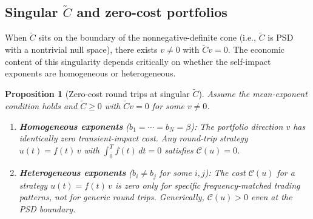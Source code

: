 \documentclass[12pt]{article}
\newtheorem{proposition}[theorem]{Proposition}
\theoremstyle{definition}
\theoremstyle{remark}
\newcommand{\bC}{\widetilde{C}}
\begin{document}
\subsection{Singular \texorpdfstring{$\bC$}{C-tilde} and zero-cost portfolios}
\label{sec:singular}

When $\bC$ sits on the boundary of the nonnegative-definite cone (i.e., $\bC$
is PSD with a nontrivial null space), there exists $v\neq 0$ with $\bC v = 0$.
The economic content of this singularity depends critically on whether the
self-impact exponents are homogeneous or heterogeneous.

\begin{proposition}[Zero-cost round trips at singular $\bC$]\label{prop:singular}
Assume the mean-exponent condition holds and $\bC\ge 0$ with $\bC v = 0$
for some $v\neq 0$.
\begin{enumerate}[label=\textup{(\roman*)},nosep]
\item \textbf{Homogeneous exponents} ($b_1=\cdots=b_N=\beta$):
  The portfolio direction $v$ has identically zero transient-impact cost.
  Any round-trip strategy $u(t) = f(t)\,v$ with $\int_0^T f(t)\,dt = 0$
  satisfies $\mathcal{C}(u) = 0$.
\item \textbf{Heterogeneous exponents} ($b_i\neq b_j$ for some $i,j$):
  The cost $\mathcal{C}(u)$ for a strategy $u(t) = f(t)\,v$ is zero only for
  specific frequency-matched trading patterns, not for generic round trips.
  Generically, $\mathcal{C}(u) > 0$ even at the PSD boundary.
\end{enumerate}
\end{proposition}
\end{document}
